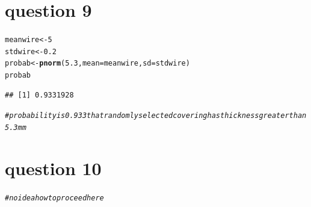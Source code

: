\documentclass{article}\usepackage[]{graphicx}\usepackage[]{xcolor}
\makeatletter
\newcommand{\hlnum}[1]{\textcolor[rgb]{0.686,0.059,0.569}{#1}}%
\newcommand{\hlcom}[1]{\textcolor[rgb]{0.678,0.584,0.686}{\textit{#1}}}%
\newcommand{\hldef}[1]{\textcolor[rgb]{0.345,0.345,0.345}{#1}}%
\newcommand{\hlkwb}[1]{\textcolor[rgb]{0.69,0.353,0.396}{#1}}%
\newcommand{\hlkwc}[1]{\textcolor[rgb]{0.333,0.667,0.333}{#1}}%
\newcommand{\hlkwd}[1]{\textcolor[rgb]{0.737,0.353,0.396}{\textbf{#1}}}%
\newenvironment{kframe}{%
 \def\at@end@of@kframe{}%
 \ifinner\ifhmode%
  \def\at@end@of@kframe{\end{minipage}}%
  \begin{minipage}{\columnwidth}%
 \fi\fi%
 \def\FrameCommand##1{\hskip\@totalleftmargin \hskip-\fboxsep
 \colorbox{shadecolor}{##1}\hskip-\fboxsep
     \hskip-\linewidth \hskip-\@totalleftmargin \hskip\columnwidth}%
 \MakeFramed {\advance\hsize-\width
   \@totalleftmargin\z@ \linewidth\hsize
   \@setminipage}}%
 {\par\unskip\endMakeFramed%
 \at@end@of@kframe}
\newenvironment{knitrout}{}{} %
\makeatother
\begin{document}
\section{question 9}
\begin{knitrout}
\color{fgcolor}\begin{kframe}
\begin{alltt}
\hldef{meanwire} \hlkwb{<-} \hlnum{5}
\hldef{stdwire} \hlkwb{<-} \hlnum{0.2}
\hldef{probab} \hlkwb{<-} \hlkwd{pnorm}\hldef{(}\hlnum{5.3}\hldef{,} \hlkwc{mean}\hldef{=meanwire,} \hlkwc{sd}\hldef{=stdwire)}
\hldef{probab}
\end{alltt}
\begin{verbatim}
## [1] 0.9331928
\end{verbatim}
\begin{alltt}
\hlcom{# probability is 0.933 that randomly selected covering has thickness greater than 5.3mm}
\end{alltt}
\end{kframe}
\end{knitrout}
\section{question 10}

\begin{knitrout}
\color{fgcolor}\begin{kframe}
\begin{alltt}
\hlcom{# no idea how to proceed here}
\end{alltt}
\end{kframe}
\end{knitrout}
\end{document}
